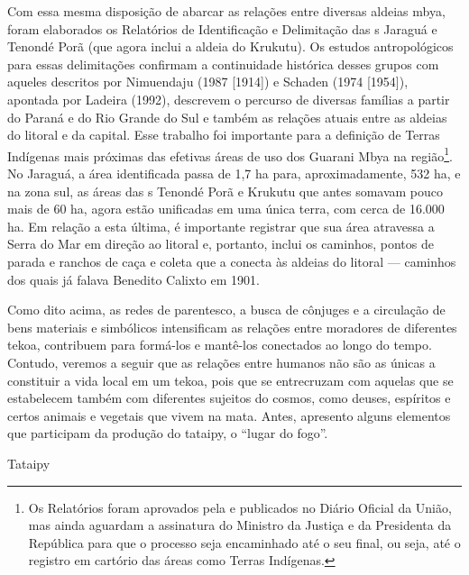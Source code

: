 Com essa mesma disposição de abarcar as relações entre diversas aldeias
mbya, foram elaborados os Relatórios de Identificação e Delimitação das
s Jaraguá e Tenondé Porã (que agora inclui a aldeia do Krukutu). Os
estudos antropológicos para essas delimitações confirmam a continuidade
histórica desses grupos com aqueles descritos por Nimuendaju (1987
[1914]) e Schaden (1974 [1954]), apontada por Ladeira (1992), descrevem
o percurso de diversas famílias a partir do Paraná e do Rio Grande do
Sul e também as relações atuais entre as aldeias do litoral e da
capital. Esse trabalho foi importante para a definição de Terras
Indígenas mais próximas das efetivas áreas de uso dos Guarani Mbya na
região\footnote{Os Relatórios foram aprovados pela  e publicados
no Diário Oficial da União, mas ainda aguardam a assinatura do Ministro
da Justiça e da Presidenta da República para que o processo seja
encaminhado até o seu final, ou seja, até o registro em cartório das
áreas como Terras Indígenas.}. No Jaraguá, a área identificada passa de
1,7 ha para, aproximadamente, 532 ha, e na zona sul, as áreas das s
Tenondé Porã e Krukutu que antes somavam pouco mais de 60 ha, agora
estão unificadas em uma única terra, com cerca de 16.000 ha. Em relação
a esta última, é importante registrar que sua área atravessa a Serra do
Mar em direção ao litoral e, portanto, inclui os caminhos, pontos de
parada e ranchos de caça e coleta que a conecta às aldeias do litoral —
caminhos dos quais já falava Benedito Calixto em 1901.

Como dito acima, as redes de parentesco, a busca de cônjuges e a
circulação de bens materiais e simbólicos intensificam as relações
entre moradores de diferentes tekoa, contribuem para formá-los e
mantê-los conectados ao longo do tempo. Contudo, veremos a seguir que
as relações entre humanos não são as únicas a constituir a vida local
em um tekoa, pois que se entrecruzam com aquelas que se estabelecem
também com diferentes sujeitos do cosmos, como deuses, espíritos e
certos animais e vegetais que vivem na mata. Antes, apresento alguns
elementos que participam da produção do tataipy, o ``lugar do fogo''.

Tataipy

